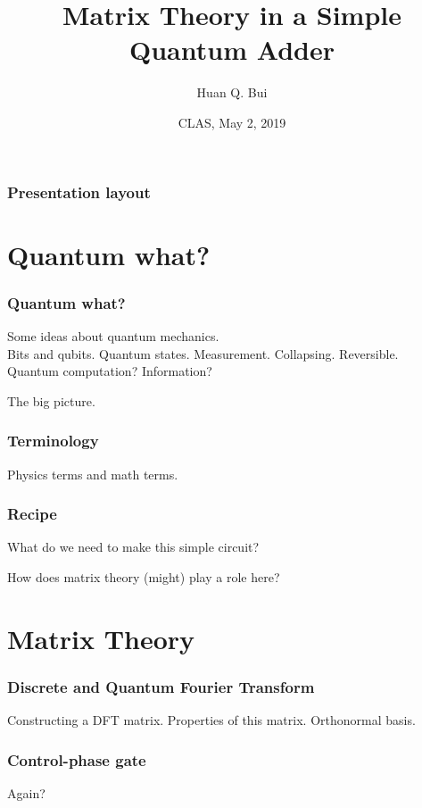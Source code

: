 \documentclass{beamer}
\title{Matrix Theory in a Simple Quantum Adder}
\author[Huan Q. Bui] %
{Huan Q. Bui}
\institute[Colby College] %
{
	
	Matrix Analysis
	\and
	Professor Leo Livshits
}
\date{CLAS, May 2, 2019}
\theoremstyle{definition}
\begin{document}
 
\frame{\titlepage}
 
\begin{frame}
\frametitle{Presentation layout}
\tableofcontents
\end{frame}

\section{Quantum what?}

\begin{frame}
\frametitle{Quantum what?}
Some ideas about quantum mechanics.\\

Bits and qubits. Quantum states. Measurement. Collapsing. Reversible.\\

Quantum computation? Information?

The big picture.
\end{frame}

\begin{frame}
\frametitle{Terminology}

Physics terms and math terms.

\end{frame}


\begin{frame}
\frametitle{Recipe}

What do we need to make this simple circuit?

How does matrix theory (might) play a role here?

\end{frame}








\section{Matrix Theory}

\begin{frame}
\frametitle{Discrete and Quantum Fourier Transform}
Constructing a DFT matrix.
Properties of this matrix.
Orthonormal basis.
\end{frame}

\begin{frame}
\frametitle{Control-phase gate}
Again?
\end{frame}
\end{document}
